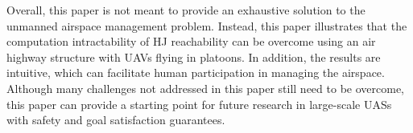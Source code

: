 Overall, this paper is not meant to provide an exhaustive solution to the unmanned airspace management problem. Instead, this paper illustrates that the computation intractability of HJ reachability can be overcome using an air highway structure with UAVs flying in platoons. In addition, the results are intuitive, which can facilitate human participation in managing the airspace. Although many challenges not addressed in this paper still need to be overcome, this paper can provide a starting point for future research in large-scale UASs with safety and goal satisfaction guarantees.